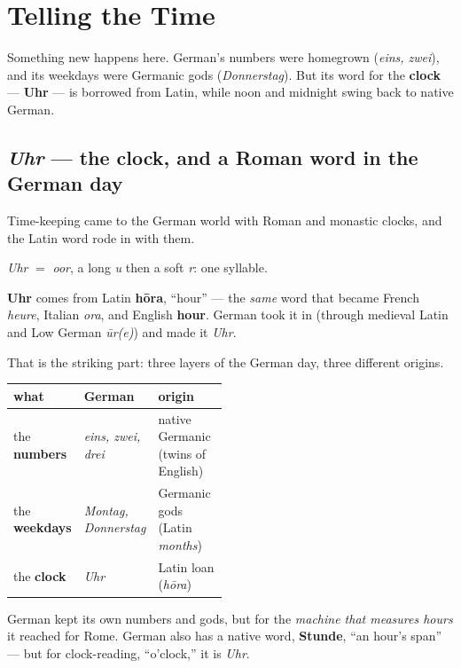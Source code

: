 \chapter{Telling the Time}
\label{ch:time}

Something new happens here. German's numbers were homegrown (\emph{eins,
zwei}), and its weekdays were Germanic gods (\emph{Donnerstag}). But its word
for the \textbf{clock} --- \textbf{Uhr} --- is borrowed from Latin, while noon
and midnight swing back to native German.

\section{\emph{Uhr} --- the clock, and a Roman word in the German day}
\label{lesson:uhr}

Time-keeping came to the German world with Roman and monastic clocks, and the
Latin word rode in with them.

\begin{sounds}
\emph{Uhr} $=$ \emph{oor}, a long \emph{u} then a soft \emph{r}: one syllable.
\end{sounds}

\begin{cousinweb}
\textbf{Uhr} comes from Latin \textbf{h\={o}ra}, ``hour'' --- the \emph{same}
word that became French \emph{heure}, Italian \emph{ora}, and English
\textbf{hour}. German took it in (through medieval Latin and Low German
\emph{\={u}r(e)}) and made it \emph{Uhr}.
\end{cousinweb}

That is the striking part: three layers of the German day, three different
origins.

\noindent
\begin{tabularx}{\linewidth}{@{}>{\raggedright\arraybackslash}p{0.20\linewidth}>{\raggedright\arraybackslash}p{0.28\linewidth}>{\raggedright\arraybackslash}X@{}}
\toprule
what & German & origin \\
\midrule
the \textbf{numbers} & \emph{eins, zwei, drei} & native Germanic (twins of English) \\
the \textbf{weekdays} & \emph{Montag, Donnerstag} & Germanic gods (Latin \emph{months}) \\
the \textbf{clock} & \emph{Uhr} & Latin loan (\emph{h\={o}ra}) \\
\bottomrule
\end{tabularx}

German kept its own numbers and gods, but for the \emph{machine that measures
hours} it reached for Rome. German also has a native word, \textbf{Stunde},
``an hour's span'' --- but for clock-reading, ``o'clock,'' it is \emph{Uhr}.

